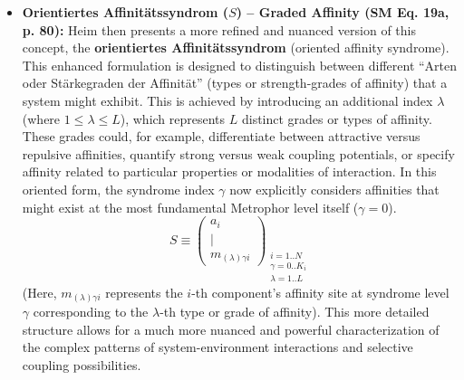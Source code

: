 \documentclass[12pt]{article}
\newcommand{\q}[1]{\enquote{#1}}
\newcommand{\affinitaetssyndrom}{S}
\begin{document}
\begin{itemize}
    \item \textbf{Orientiertes Affinitätssyndrom (\( \affinitaetssyndrom \)) – Graded Affinity (SM Eq. 19a, p. 80):}
    Heim then presents a more refined and nuanced version of this concept, the \textbf{orientiertes Affinitätssyndrom} (oriented affinity syndrome). This enhanced formulation is designed to distinguish between different \q{Arten oder Stärkegraden der Affinität} (types or strength-grades of affinity) that a system might exhibit. This is achieved by introducing an additional index \( \lambda \) (where \( 1 \leq \lambda \leq L \)), which represents \( L \) distinct grades or types of affinity. These grades could, for example, differentiate between attractive versus repulsive affinities, quantify strong versus weak coupling potentials, or specify affinity related to particular properties or modalities of interaction. In this oriented form, the syndrome index \( \gamma \) now explicitly considers affinities that might exist at the most fundamental Metrophor level itself (\(\gamma=0\)).
    \begin{equation}
    S \equiv \begin{pmatrix} a_i \\ | \\ m_{(\lambda)\gamma i} \end{pmatrix}_{\substack{i=1..N \\ \gamma=0..K_i \\ \lambda=1..L}}
    \label{eq:original_affinitaetssyndrom_oriented}
    \end{equation}
    (Here, \( m_{(\lambda)\gamma i} \) represents the \(i\)-th component's affinity site at syndrome level \(\gamma\) corresponding to the \(\lambda\)-th type or grade of affinity). This more detailed structure allows for a much more nuanced and powerful characterization of the complex patterns of system-environment interactions and selective coupling possibilities.


\end{itemize}
\end{document}
